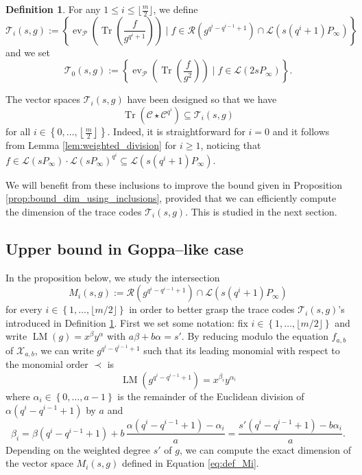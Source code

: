 \documentclass[a4paper]{amsart}
\theoremstyle{definition}
\newtheorem{definition}[thm]{Definition}
\theoremstyle{remark}
\DeclareMathOperator{\ev}{ev}
\DeclareMathOperator{\trace}{Tr}
\newcommand{\calP}{\mathcal{P}}
\newcommand{\calL}{\mathcal{L}}
\newcommand{\calC}{\mathcal{C}}
\newcommand{\calR}{\mathcal{R}}
\newcommand{\calT}{\mathcal{T}}
\newcommand{\calX}{\mathcal{X}}
\newcommand{\Tr}[1]{\trace\!\left(#1\right)}
\newcommand{\set}[1]{\left\{#1\right\}}
\newcommand{\LM}[1]{\operatorname{LM}\left(#1\right)}
\begin{document}
\begin{definition} \label{def:T_i's}
For any $1 \leq i \leq \lfloor\frac{m}{2}\rfloor$, we define
$$\calT_i(s,g):=\set{\ev_{\calP}\left(\Tr{\frac{f}{g^{q^i+1}}}\right) \mid f \in \calR\left(g^{q^i-q^{i-1}+1}\right)  \cap \calL(s(q^i+1)P_\infty)}$$
and we set $$\calT_0(s,g) := \set{\ev_{\calP}\left(\Tr{\frac{f}{g^{2}}}\right) \mid f \in \calL(2sP_\infty)}.$$
\end{definition}

The vector spaces $\calT_i(s,g)$ have been designed so that we have
\begin{equation} \label{eq:Tr(C*C^q^i)_dans_T_i} 
\Tr{\calC \star \calC^{q^i}} \subseteq \calT_i(s,g)
\end{equation}
for all $i \in \set{0,\dots,\left\lfloor \frac{m}{2} \right\rfloor}$. Indeed, it is straightforward for $i=0$ and it follows from Lemma \ref{lem:weighted_division} for $i \geq 1$, noticing that $f \in \calL(sP_\infty) \cdot \calL(sP_\infty)^{q^i} \subseteq \calL(s(q^i+1)P_\infty)$. 

We will benefit from these inclusions to improve the bound given in Proposition \ref{prop:bound_dim_using_inclusions}, provided that we can efficiently compute the dimension of the trace codes $\calT_i(s,g)$. This is studied in the next section.

\subsection{Upper bound in Goppa--like case} \label{subsection : Upper_bound_Goppa-like}
In the proposition below, we study the intersection 
\begin{equation}\label{eq:def_Mi}
M_i(s,g):=   \calR\left(g^{q^{i}-q^{i-1}+1}\right) \cap \calL(s(q^i+1)P_\infty)
\end{equation}
for every $i \in \set{1,\dots,\lfloor m/2 \rfloor}$ in order to better grasp the trace codes $\calT_i(s,g)$'s introduced in Definition \ref{def:T_i's}.
First we set some notation: fix $i \in \set{1,\dots,\lfloor m/2 \rfloor}$ and write $\LM{g}=x^\beta y^\alpha$ with $a\beta + b\alpha=s'$. By reducing modulo the equation $f_{a,b}$ of $\calX_{a,b}$, we can write $g^{q^i-q^{i-1}+1}$ such that its leading monomial with respect to the monomial order $\prec$ is
\begin{equation}\label{eq:gi}
 \LM{g^{q^i-q^{i-1}+1}}=x^{\beta_i} y^{\alpha_i}
\end{equation}
 where $\alpha_i \in \set{0,\dots,a-1}$ is the remainder of the Euclidean division of $\alpha (q^i-q^{i-1}+1)$ by $a$ and 
 \begin{equation}\label{eq:value_beta_prime}
  \beta_i=\beta(q^i-q^{i-1}+1) + b \, \frac{\alpha(q^i-q^{i-1}+1)-\alpha_i}{a}= \frac{s'(q^i-q^{i-1}+1)-b\alpha_i}{a}.
 \end{equation}
%
Depending on the weighted degree $s'$ of $g$, we can compute the exact dimension of the vector space $M_i(s,g)$ defined in Equation \eqref{eq:def_Mi}.
\end{document}
